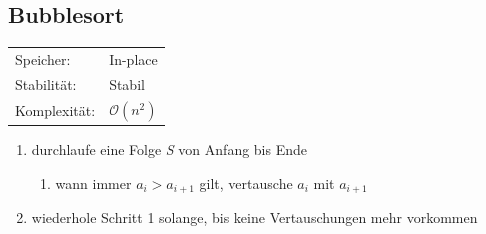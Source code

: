 \documentclass[12pt,a4paper]{article}
\begin{document}
\subsection{Bubblesort}
\begin{tabularx}{\textwidth}{l l}
	Speicher: &In-place\\
	Stabilität: &Stabil\\
	Komplexität: &$\mathcal{O}(n^2)$\\
\end{tabularx}
\vspace{.8cm}
\newline
\begin{minipage}[c]{0.7\textwidth}
	\begin{enumerate}
		\item durchlaufe eine Folge \textit{S} von Anfang bis Ende
		\begin{enumerate}
			\item wann immer $a_i > a_{i+1}$ gilt, vertausche $a_i$ mit $a_{i+1}$
		\end{enumerate}
		\item wiederhole Schritt 1 solange, bis keine Vertauschungen mehr vorkommen
	\end{enumerate}
\end{minipage}
\end{document}
